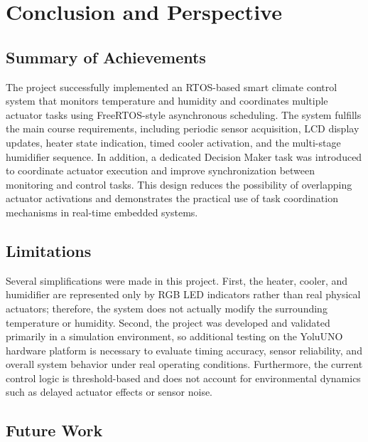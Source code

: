 \section{Conclusion and Perspective}

\subsection{Summary of Achievements}

The project successfully implemented an RTOS-based smart climate control system that monitors temperature and humidity
and coordinates multiple actuator tasks using FreeRTOS-style asynchronous scheduling. The system fulfills the main
course requirements, including periodic sensor acquisition, LCD display updates, heater state indication, timed cooler
activation, and the multi-stage humidifier sequence. In addition, a dedicated Decision Maker task was introduced to
coordinate actuator execution and improve synchronization between monitoring and control tasks. This design reduces the
possibility of overlapping actuator activations and demonstrates the practical use of task coordination mechanisms in
real-time embedded systems.

\subsection{Limitations}

Several simplifications were made in this project. First, the heater, cooler, and humidifier are represented only by
RGB LED indicators rather than real physical actuators; therefore, the system does not actually modify the surrounding
temperature or humidity. Second, the project was developed and validated primarily in a simulation environment, so
additional testing on the YoluUNO hardware platform is necessary to evaluate timing accuracy, sensor reliability, and
overall system behavior under real operating conditions. Furthermore, the current control logic is threshold-based and
does not account for environmental dynamics such as delayed actuator effects or sensor noise.

\subsection{Future Work}

